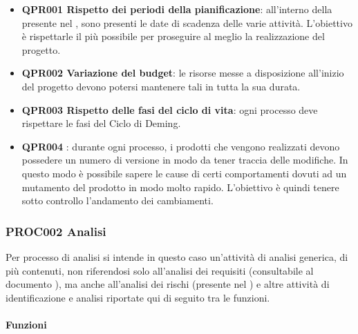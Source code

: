 		\begin{itemize} 
			\item \textbf{QPR001 Rispetto dei periodi della pianificazione}: all'interno della presente nel \PdPd, sono presenti le date di scadenza delle varie attività. L'obiettivo è rispettarle il più possibile per proseguire al meglio la realizzazione del progetto.
			\item \textbf{QPR002 Variazione del budget}: le risorse messe a disposizione all'inizio del progetto devono potersi mantenere tali in tutta la sua durata.
			\item \textbf{QPR003 Rispetto delle fasi del ciclo di vita}: ogni processo deve rispettare le fasi del Ciclo di Deming.
			\item \textbf{QPR004 }: durante ogni processo, i prodotti che vengono realizzati devono possedere un numero di versione in modo da tener traccia delle modifiche. In questo modo è possibile sapere le cause di certi comportamenti dovuti ad un mutamento del prodotto in modo molto rapido. L'obiettivo è quindi tenere sotto controllo l'andamento dei cambiamenti.
		\end{itemize}
	
	\subsubsection{PROC002 Analisi}
	Per processo di analisi si intende in questo caso un'attività di analisi generica, di più contenuti, non riferendosi solo all'analisi dei requisiti (consultabile al documento \AdRd), ma anche all'analisi dei rischi (presente nel \PdPd) e altre attività di identificazione e analisi riportate qui di seguito tra le funzioni.

	
	
		\paragraph*{Funzioni}
		
